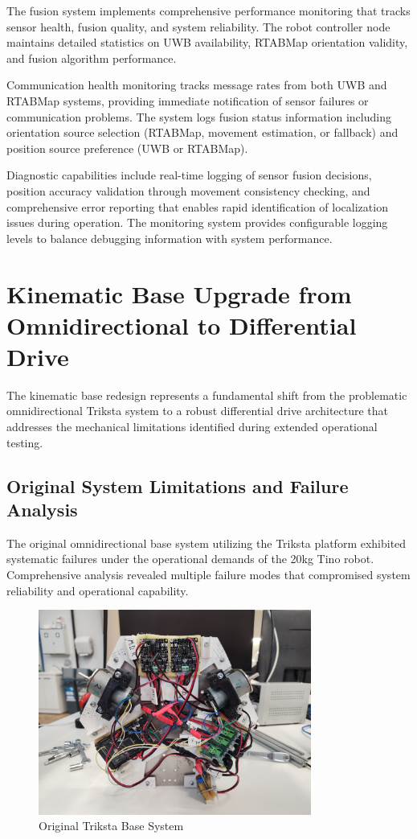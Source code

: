The fusion system implements comprehensive performance monitoring that tracks sensor health, fusion quality, and system reliability. The robot controller node maintains detailed statistics on UWB availability, RTABMap orientation validity, and fusion algorithm performance.

Communication health monitoring tracks message rates from both UWB and RTABMap systems, providing immediate notification of sensor failures or communication problems. The system logs fusion status information including orientation source selection (RTABMap, movement estimation, or fallback) and position source preference (UWB or RTABMap).

Diagnostic capabilities include real-time logging of sensor fusion decisions, position accuracy validation through movement consistency checking, and comprehensive error reporting that enables rapid identification of localization issues during operation. The monitoring system provides configurable logging levels to balance debugging information with system performance.


\section{Kinematic Base Upgrade from Omnidirectional to Differential Drive}

The kinematic base redesign represents a fundamental shift from the problematic omnidirectional Triksta system to a robust differential drive architecture that addresses the mechanical limitations identified during extended operational testing.

\subsection{Original System Limitations and Failure Analysis}

The original omnidirectional base system utilizing the Triksta platform exhibited systematic failures under the operational demands of the 20kg Tino robot. Comprehensive analysis revealed multiple failure modes that compromised system reliability and operational capability.

\begin{figure}[H]
    \centering
    \includegraphics[width=0.8\textwidth]{Images/OriginalTrikstaBase.jpg}
    \caption{Original Triksta Base System}
    \label{fig:original_triksta_base}
\end{figure}

